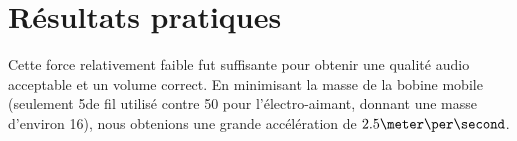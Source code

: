 \section{Résultats pratiques}
Cette force relativement faible fut suffisante pour obtenir une qualité audio acceptable et un volume correct. 
En minimisant la masse de la bobine mobile (seulement 5\meter de fil utilisé contre 50 pour l'électro-aimant, 
donnant une masse d'environ 16\gram), nous obtenions une grande accélération de $2.5\meter\per\second$. 
